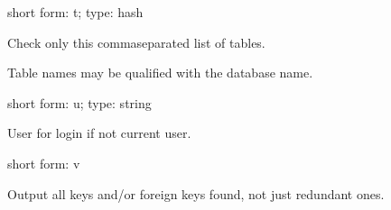 \documentclass[letterpaper,10pt,english]{sphinxmanual}
\begin{document}
\begin{fulllineitems}
\label{\detokenize{mariadb-index-checker:cmdoption-mariadb-index-checker-tables}}
\sphinxAtStartPar
short form: \sphinxhyphen{}t; type: hash

\sphinxAtStartPar
Check only this comma\sphinxhyphen{}separated list of tables.

\sphinxAtStartPar
Table names may be qualified with the database name.

\end{fulllineitems}


\begin{fulllineitems}
\label{\detokenize{mariadb-index-checker:cmdoption-mariadb-index-checker-user}}
\sphinxAtStartPar
short form: \sphinxhyphen{}u; type: string

\sphinxAtStartPar
User for login if not current user.

\end{fulllineitems}


\begin{fulllineitems}
\label{\detokenize{mariadb-index-checker:cmdoption-mariadb-index-checker-verbose}}
\sphinxAtStartPar
short form: \sphinxhyphen{}v

\sphinxAtStartPar
Output all keys and/or foreign keys found, not just redundant ones.

\end{fulllineitems}
\end{document}
